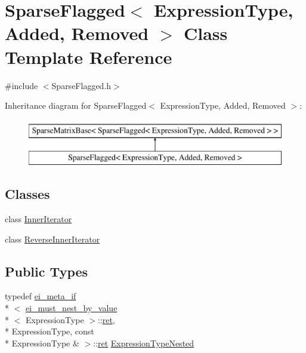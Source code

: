 \hypertarget{class_sparse_flagged}{\section{Sparse\-Flagged$<$ Expression\-Type, Added, Removed $>$ Class Template Reference}
\label{class_sparse_flagged}
}


{\ttfamily \#include $<$Sparse\-Flagged.\-h$>$}

Inheritance diagram for Sparse\-Flagged$<$ Expression\-Type, Added, Removed $>$\-:\begin{figure}[H]
\begin{center}
\leavevmode
\includegraphics[height=2.000000cm]{class_sparse_flagged}
\end{center}
\end{figure}
\subsection*{Classes}
\begin{DoxyCompactItemize}
\item 
class \hyperlink{class_sparse_flagged_1_1_inner_iterator}{Inner\-Iterator}
\item 
class \hyperlink{class_sparse_flagged_1_1_reverse_inner_iterator}{Reverse\-Inner\-Iterator}
\end{DoxyCompactItemize}
\subsection*{Public Types}
\begin{DoxyCompactItemize}
\item 
typedef \hyperlink{structei__meta__if}{ei\-\_\-meta\-\_\-if}\\*
$<$ \hyperlink{structei__must__nest__by__value}{ei\-\_\-must\-\_\-nest\-\_\-by\-\_\-value}\\*
$<$ Expression\-Type $>$\-::\hyperlink{group___i_p_conn_plugin_gabc99fe6afec1a75ccff1092e47375a40}{ret}, \\*
Expression\-Type, const \\*
Expression\-Type \& $>$\-::\hyperlink{group___i_p_conn_plugin_gabc99fe6afec1a75ccff1092e47375a40}{ret} \hyperlink{class_sparse_flagged_a418bcbaf56ee186affbad6a4cd3dab43}{Expression\-Type\-Nested}
\end{DoxyCompactItemize}
